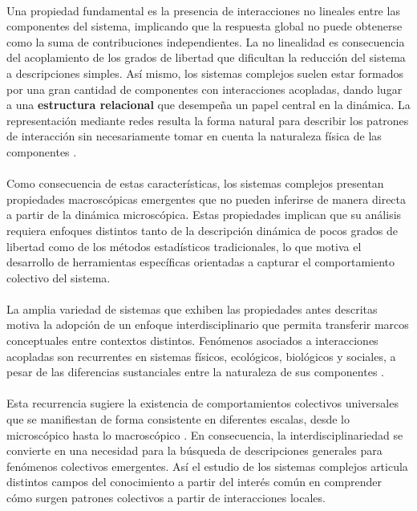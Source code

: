 \\
Una propiedad fundamental es la presencia de interacciones no lineales entre las componentes del sistema, implicando que la respuesta global no puede obtenerse como la suma de contribuciones independientes. La no linealidad es consecuencia del acoplamiento de los grados de libertad que dificultan la reducción del sistema a descripciones simples. Así mismo, los sistemas complejos suelen estar formados por una gran cantidad de componentes con interacciones acopladas, dando lugar a una \textbf{estructura relacional} que desempeña un papel central en la dinámica. La representación mediante redes resulta la forma natural para describir los patrones de interacción sin necesariamente tomar en cuenta la naturaleza física de las componentes \cite{posfai2016network,newman2018networks}.\\
\\
Como consecuencia de estas características, los sistemas complejos presentan propiedades macroscópicas emergentes que no pueden inferirse de manera directa a partir de la dinámica microscópica. Estas propiedades implican que su análisis requiera enfoques distintos tanto de la descripción dinámica de pocos grados de libertad como de los métodos estadísticos tradicionales, lo que motiva el desarrollo de herramientas específicas orientadas a capturar el comportamiento colectivo del sistema.
\\
\\
La amplia variedad de sistemas que exhiben las propiedades antes descritas motiva la adopción de un enfoque interdisciplinario que permita transferir marcos conceptuales entre contextos distintos. Fenómenos asociados a interacciones acopladas son recurrentes en sistemas físicos, ecológicos, biológicos y sociales, a pesar de las diferencias sustanciales entre la naturaleza de sus componentes \cite{Koppen2005Interdisciplina}. \\
\\
Esta recurrencia sugiere la existencia de comportamientos colectivos universales que se manifiestan de forma consistente en diferentes escalas, desde lo microscópico hasta lo macroscópico \cite[p. 97--103]{ramirez1999perspectivas}. En consecuencia, la interdisciplinariedad se convierte en una necesidad para la búsqueda de descripciones generales para fenómenos colectivos emergentes. Así el estudio de los sistemas complejos articula distintos campos del conocimiento a partir del interés común en comprender cómo surgen patrones colectivos a partir de interacciones locales.\\

